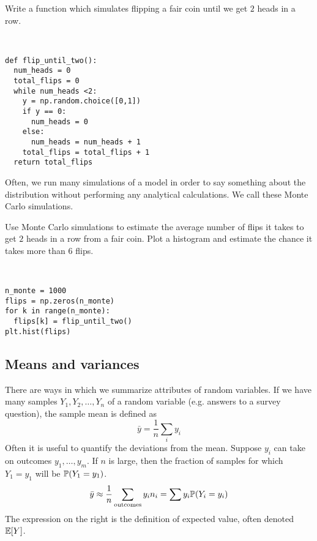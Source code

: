  \begin{example}
Write a function which simulates flipping a fair coin until we get $2$ heads in a row. 
\end{example} 
\begin{solution}
\,
\begin{Verbatim}
def flip_until_two():
  num_heads = 0
  total_flips = 0
  while num_heads <2:
    y = np.random.choice([0,1])
    if y == 0:
      num_heads = 0
    else:
      num_heads = num_heads + 1
    total_flips = total_flips + 1
  return total_flips
 \end{Verbatim}
 \end{solution}

Often, we run many simulations of a model in order to say something about the distribution without performing any analytical calculations. We call these {\dfn Monte Carlo} simulations. 
\begin{exercise}
Use Monte Carlo simulations to estimate the average number of flips it takes to get $2$ heads in a row from a fair coin. Plot a histogram and estimate the chance it takes more than $6$ flips. 
\end{exercise}
\begin{solution}
\,
\begin{Verbatim}
n_monte = 1000
flips = np.zeros(n_monte)
for k in range(n_monte):
  flips[k] = flip_until_two()
plt.hist(flips)
 \end{Verbatim}
\end{solution}



\subsection{Means and variances}
There are ways in which we summarize attributes of random variables. 
If we have many samples $Y_1,Y_2,\dots,Y_n$ of a random variable (e.g. answers to a survey question), the {\dfn sample mean} is defined as 
\begin{equation}
\bar{y} = \frac{1}{n}\sum_{i}y_i
\end{equation}
 Often it is useful to quantify the deviations from the mean. Suppose $y_i$ can take on outcomes $y_1,\dots,y_m$. If $n$ is large, then the fraction of samples for which $Y_1= y_1$ will be $\mathbb P(Y_1=y_1)$.  
 \begin{equation}
\bar{y} \approx \frac{1}{n} \sum_{\rm outcomes} y_in_i= \sum y_i \mathbb P(Y_i=y_i) 
\end{equation}
The expression on the right is the definition of expected value, often denoted $\mathbb E[Y]$. 


